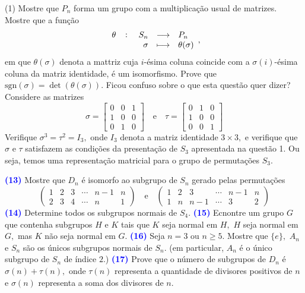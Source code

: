 \documentclass[12pt, a4paper]{article}
\newcommand{\negrito}[1]{\mbox{\boldmath{$#1$}}}
\begin{document}
\begin{tasks}[counter-format={(tsk[a])},label-width=3.6ex, label-format = {\bfseries}, column-sep = {0pt}](1)
\task[\textcolor{Floresta}{$\negrito{(a)} $}] Mostre que $P_n$ forma um grupo com a multiplicação usual de matrizes.
\task[\textcolor{Floresta}{$\negrito{(b)} $}] Mostre que a função
\[
\fullfunction{\theta}{S_n}{P_n}{\sigma}{\theta(\sigma)},
\]
em que $\theta(\sigma)$ denota a mattriz cuja $i$-ésima coluna coincide com a $\sigma(i)$-ésima coluna da matriz identidade, é um isomorfismo.
\task[\textcolor{Floresta}{$\negrito{(c)} $}] Prove que $\mbox{sgn}(\sigma) = \det(\theta(\sigma)).$
\task[\textcolor{Floresta}{$\negrito{(d)} $}] Ficou confuso sobre o que esta questão quer dizer? Considere as matrizes
\[
\sigma = \left[ \begin{array}{ccc}0 & 0 & 1 \\ 1 & 0 & 0 \\ 0 & 1 & 0 \end{array}\right] \quad \mbox{e} \quad \tau = \left[ \begin{array}{ccc}0 & 1 & 0 \\ 1 & 0 & 0 \\ 0 & 0 & 1 \end{array}\right]
\]
Verifique $\sigma^3 = \tau^2 = I_3,$ onde $I_3$ denota a matriz identidade $3 \times 3,$ e verifique que $\sigma$ e $\tau$ satisfazem as condições da presentação de $S_3$ apresentada na questão 1. Ou seja, temos uma representação matricial para o grupo de permutações $S_3.$
\end{tasks}
\textcolor{blue}{\bf(13)}\label{76} Mostre que $D_n$ é isomorfo ao subgrupo de $S_n$ gerado pelas permutações
\[
\left( \begin{array}{cccccc}
1 & 2 & 3 &\cdots & n-1 & n \\
2 & 3 & 4 &\cdots & n & 1
\end{array}\right) \quad \mbox{e} \quad \left( \begin{array}{cccccc}
1 & 2 & 3 & \cdots & n-1 & n \\
1 & n & n-1 & \cdots & 3 & 2
\end{array}\right)
\]
\textcolor{blue}{\bf(14)}\label{77} Determine todos os subgrupos normais de $S_4.$
\newline
\newline
\textcolor{blue}{\bf(15)}\label{78}  Ecnontre um grupo $G$ que contenha subgrupos $H$ e $K$ tais que $K$ seja normal em $H,$ $H$ seja normal em $G,$ mas $K$ não seja normal em $G.$
\newline
\newline
\textcolor{blue}{\bf(16)}\label{79} Seja $n = 3$ ou $n \ge 5.$ Mostre que $\{ e \},$ $A_n$ e $S_n$ são os únicos subgrupos normais de $S_n.$ (em particular, $A_n$ é o único subgrupo de $S_n$ de índice $2.$)
\newline
\newline
\textcolor{blue}{\bf(17)}\label{80} Prove que o número de subgrupos de $D_n$ é $\sigma(n) + \tau(n),$ onde $\tau(n)$ representa a quantidade de divisores positivos de $n$ e $\sigma(n)$ representa a soma dos divisores de $n.$
\end{document}
